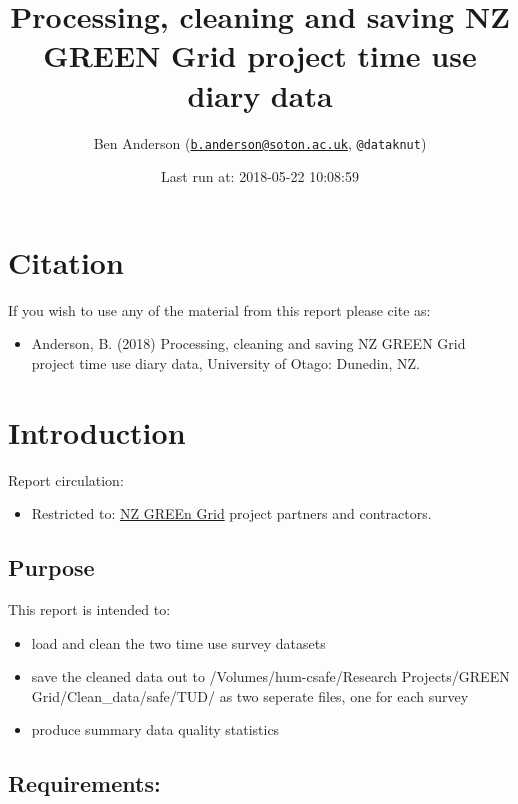 \documentclass[]{article}
\title{Processing, cleaning and saving NZ GREEN Grid project time use diary
data}
\author{Ben Anderson
(\href{mailto:b.anderson@soton.ac.uk}{\nolinkurl{b.anderson@soton.ac.uk}},
\texttt{@dataknut})}
\date{Last run at: 2018-05-22 10:08:59}
\providecommand{\tightlist}{%
  \setlength{\itemsep}{0pt}\setlength{\parskip}{0pt}}
\begin{document}
\maketitle

{
\setcounter{tocdepth}{2}
\tableofcontents
}
\newpage

\section{Citation}\label{citation}

If you wish to use any of the material from this report please cite as:

\begin{itemize}
\tightlist
\item
  Anderson, B. (2018) Processing, cleaning and saving NZ GREEN Grid
  project time use diary data, University of Otago: Dunedin, NZ.
\end{itemize}

\newpage

\section{Introduction}\label{introduction}

Report circulation:

\begin{itemize}
\tightlist
\item
  Restricted to:
  \href{https://www.otago.ac.nz/centre-sustainability/research/energy/otago050285.html}{NZ
  GREEn Grid} project partners and contractors.
\end{itemize}

\subsection{Purpose}\label{purpose}

This report is intended to:

\begin{itemize}
\tightlist
\item
  load and clean the two time use survey datasets
\item
  save the cleaned data out to /Volumes/hum-csafe/Research
  Projects/GREEN Grid/Clean\_data/safe/TUD/ as two seperate files, one
  for each survey
\item
  produce summary data quality statistics
\end{itemize}

\subsection{Requirements:}\label{requirements}
\end{document}
